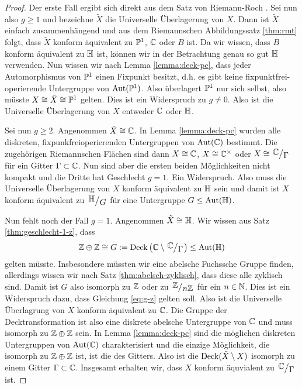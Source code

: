 \begin{proof}
  Der erste Fall ergibt sich direkt aus dem Satz von Riemann-Roch
  \cite[Kor. 16.13]{For}. Sei
  nun also $g \geq 1$ und bezeichne $\tilde X$ die Universelle
  Überlagerung von $X$. Dann ist $\tilde X$ einfach zusammenhängend
  und aus dem Riemannschen Abbildungssatz \ref{thm:rmt} folgt, dass
  $\tilde X$ konform äquivalent zu $\P^1$, $\C$ oder $B$ ist. Da wir
  wissen, dass $B$ konform äquivalent zu $\h$ ist, können wir in der
  Betrachtung genau so gut $\h$ verwenden. Nun wissen wir nach Lemma
  \ref{lemma:deck-pc}, dass jeder Automorphismus von $\P^1$ einen
  Fixpunkt besitzt, d.h. es gibt keine fixpunktfrei-operierende
  Untergruppe von $\Aut(\P^1)$. Also überlagert $\P^1$ nur sich
  selbst, also müsste $X \cong \tilde X \cong \P^1$ gelten. Dies ist
  ein Widerspruch zu $g \neq 0$. Also ist die Universelle Überlagerung
  von $X$ entweder $\C$ oder $\h$.

  Sei nun $g \geq 2$. Angenommen $\tilde X \cong \C$. In Lemma
  \ref{lemma:deck-pc} wurden alle diskreten, fixpunkfreioperierenden
  Untergruppen von $\Aut(\C)$ bestimmt. Die zugehörigen Riemannschen
  Flächen sind dann $X \cong \C$, $X \cong \C^\times$ oder $X \cong
  \quot{\C}{\Gamma}$ für ein Gitter $\Gamma \subset \C$. Nun sind aber
  die ersten beiden Möglichkeiten nicht kompakt und die Dritte hat
  Geschlecht $g =1$. Ein Widerspruch. Also muss die Universelle
  Überlagerung von $X$ konform äquivalent zu $\h$ sein und damit ist
  $X$ konform äquivalent zu $\quot{\h}{G}$ für eine Untergruppe $G
  \leq \Aut(\h)$.


  Nun fehlt noch der Fall $g = 1$. Angenommen $\tilde X \cong \h$. Wir
  wissen aus Satz \ref{thm:geschlecht-1-z}, dass
  \begin{align}
    \label{eq:g-z}
  \Z \oplus \Z \cong G := \Deck \left( \C \setminus \quot{\C}{\Gamma}
  \right ) \leq \Aut(\h)
  \end{align}
  gelten müsste. Insbesondere müssten wir eine abelsche Fuchssche
  Gruppe finden, allerdings wissen wir nach Satz
  \ref{thm:abelsch-zyklisch}, dass diese alle zyklisch sind. Damit ist
  $G$ also isomorph zu $\Z$ oder zu $\quot{\Z}{n\Z}$ für ein $n \in
  \N$. Dies ist ein Widerspruch dazu, dass Gleichung \eqref{eq:g-z}
  gelten soll. Also ist die Universelle Überlagrung von $X$ konform
  äquivalent zu $\C$. Die Gruppe der Decktransformation ist also eine
  diskrete abelsche Untergruppe von $\C$ und muss isomorph zu $\Z
  \oplus \Z$ sein. In Lemma \ref{lemma:deck-pc} sind die möglichen diskreten
  Untergruppen von $\Aut(\C)$ charakterisiert und die einzige Möglichkeit, die
  isomorph zu $\Z \oplus \Z$ ist, ist die des Gitters. Also ist die
  $\Deck(\tilde X \setminus X)$ isomorph zu einem Gitter $\Gamma
  \subset \C$. Insgesamt erhalten wir, dass $X$ konform äquvialent zu
  $\quot{\C}{\Gamma}$ ist.
\end{proof}

